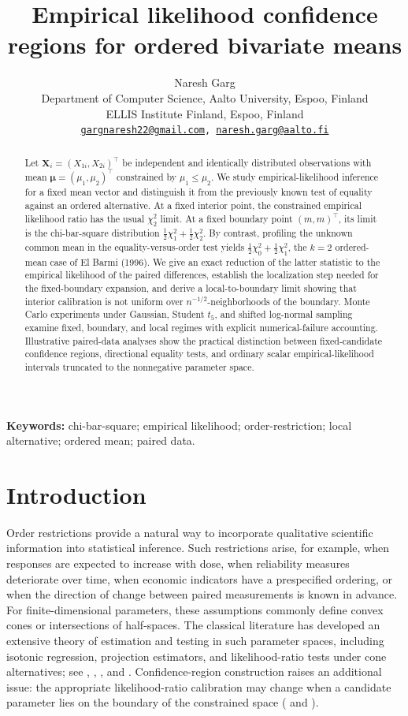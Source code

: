 \documentclass[11pt]{article}
\title{\textbf{Empirical likelihood confidence regions for ordered bivariate means}}
\author{
Naresh Garg\\
\small Department of Computer Science, Aalto University, Espoo, Finland\\
\small ELLIS Institute Finland, Espoo, Finland\\
\small \texttt{\href{mailto:gargnaresh22@gmail.com}{gargnaresh22@gmail.com},
\href{mailto:naresh.garg@aalto.fi}{naresh.garg@aalto.fi}}
}
\date{}
\theoremstyle{remark}
\begin{document}
\maketitle

\begin{abstract}
Let $\boldsymbol{X}_i=(X_{1i},X_{2i})^\top$ be independent and identically distributed observations with mean $\boldsymbol{\mu}=(\mu_1,\mu_2)^\top$ constrained by $\mu_1\leq\mu_2$. We study empirical-likelihood inference for a fixed mean vector and distinguish it from the previously known test of equality against an ordered alternative. At a fixed interior point, the constrained empirical likelihood ratio has the usual $\chi^2_2$ limit. At a fixed boundary point $(m,m)^\top$, its limit is the chi-bar-square distribution $\tfrac12\chi^2_1+\tfrac12\chi^2_2$. By contrast, profiling the unknown common mean in the equality-versus-order test yields $\tfrac12\chi^2_0+\tfrac12\chi^2_1$, the $k=2$ ordered-mean case of El Barmi (1996). We give an exact reduction of the latter statistic to the empirical likelihood of the paired differences, establish the localization step needed for the fixed-boundary expansion, and derive a local-to-boundary limit showing that interior calibration is not uniform over $n^{-1/2}$-neighborhoods of the boundary. Monte Carlo experiments under Gaussian, Student $t_5$, and shifted log-normal sampling examine fixed, boundary, and local regimes with explicit numerical-failure accounting. Illustrative paired-data analyses show the practical distinction between fixed-candidate confidence regions, directional equality tests, and ordinary scalar empirical-likelihood intervals truncated to the nonnegative parameter space.
\end{abstract}

\noindent\textbf{Keywords:} chi-bar-square; empirical likelihood; order-restriction; local alternative; ordered mean; paired data.

\section{Introduction}

Order restrictions provide a natural way to incorporate qualitative scientific information into statistical inference. Such restrictions arise, for example, when responses are expected to increase with dose, when reliability measures deteriorate over time, when economic indicators have a prespecified ordering, or when the direction of change between paired measurements is known in advance. For finite-dimensional parameters, these assumptions commonly define convex cones or intersections of half-spaces. The classical literature has developed an extensive theory of estimation and testing in such parameter spaces, including isotonic regression, projection estimators, and likelihood-ratio tests under cone alternatives; see \citet{barlow1972statistical}, \citet{robertson1988order}, \citet{van2006restricted}, \citet{silvapulle2005} and \citet{garg2024unified}. Confidence-region construction raises an additional issue: the appropriate likelihood-ratio calibration may change when a candidate parameter lies on the boundary of the constrained space (\citet{hwang1994confidence} and \citet{park2014confidence}).
\end{document}
